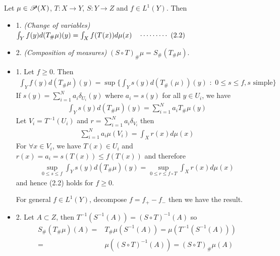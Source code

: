 \documentclass[12pt,a4paper]{article}
\newenvironment{proof}
{\begin{changemargin}{1cm}{0.5cm} 
	}%
	{\end{changemargin}
}
\renewenvironment{i}
{\begin{itemize} 
	}%
	{\end{itemize}
}
\newenvironment{p}
{\begin{proof} 
	}%
	{\end{proof}
}
\begin{document}
 Let $\mu \in \mathscr{P}(X)$, $T: X\rightarrow Y$, $S:Y\rightarrow Z$ and $f\in L^1(Y)$. Then
\begin{i}
\item[1.] \emph{(Change of variables)} $\int_Y f(y)d(T_{\#} \mu) (y) = \int_X f(T(x))d\mu(x) \quad \cdots\cdots\cdots\,\,(2.2)$
\item[2.] \emph{(Composition of measures)} $(S\circ T)_{\#}\mu = S_{\#}(T_{\#}\mu)$. 
\end{i}
\begin{p}
\pf \begin{i}
\item[1.] Let $f\geq 0$. Then
\begin{align*}
\int_Y f(y) d(T_{\#}\mu)(y) = \sup \Big\{ \int_Y s(y) d(T_{\#}(\mu))(y)\,\, : \,\, 0\leq s \leq f, s\text{ simple} \Big\}
\end{align*}
If $s(y) = \sum_{i=1}^N a_i \delta_{U_i}(y)$ where $a_i = s(y)$ for all $y\in U_i$, we have
\begin{align*}
\int_Y s(y) d(T_{\#}\mu)(y) = \sum_{i=1}^N a_i T_{\#} \mu (y)
\end{align*}
Let $V_i = T^{-1}(U_i)$ and $r= \sum_{i=1}^N a_i \delta_{V_i}$ then 
\begin{align*}
\sum_{i=1}^N a_i \mu(V_i) = \int_X r(x)d\mu(x)
\end{align*}
For $\forall x\in V_i$, we have $T(x) \in U_i$ and $r(x) = a_i = s(T(x)) \leq f(T(x))$ and therefore
\begin{align*}
\sup_{0\leq s \leq f}\int_Y s(y) d(T_{\#}\mu)(y) = \sup_{0\leq r \leq f\circ T} \int_X r(x) d\mu(x) 
\end{align*}
and hence (2.2) holds for $f\geq 0$.

\quad For general $f \in L^1(Y)$, decompose $f=f_+ - f_-$ then we have the result.
\item[2.] Let $A\subset Z$, then $T^{-1}(S^{-1}(A)) = (S\circ T)^{-1}(A)$ so
\begin{align*}
S_{\#}(T_{\#}\mu) (A) =& T_{\#}\mu(S^{-1}(A)) = \mu(T^{-1}(S^{-1}(A))) \\
=& \mu((S\circ T)^{-1} (A)) = (S\circ T)_{\#} \mu(A)
\end{align*}
\end{i}
\eop
\end{p}
\s
\end{document}
